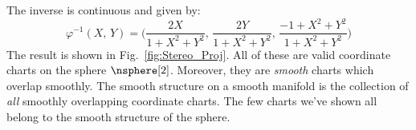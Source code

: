 \documentclass{book}                                                            %
\begin{document}
                \hfill
                \par
                The inverse is continuous and given by:
                \begin{equation}
                    \varphi^{\minus{1}}(X,\,Y)=
                    \Big(\frac{2X}{1+X^{2}+Y^{2}},\,
                         \frac{2Y}{1+X^{2}+Y^{2}},\,
                         \frac{\minus{1}+X^{2}+Y^{2}}{1+X^{2}+Y^{2}}\Big)
                \end{equation}
                The result is shown in Fig.~\ref{fig:Stereo_Proj}. All of these
                are valid coordinate charts on the sphere $\nsphere[2]$.
                Moreover, they are \textit{smooth} charts which overlap
                smoothly. The smooth structure on a smooth manifold is the
                collection of \textit{all} smoothly overlapping coordinate
                charts. The few charts we've shown all belong to the smooth
                structure of the sphere.
\end{document}
